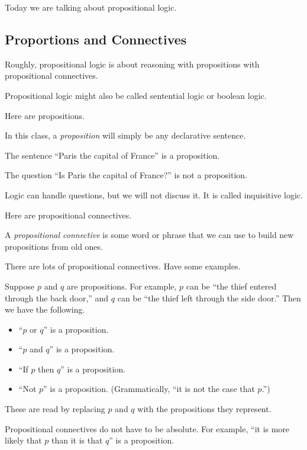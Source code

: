 

Today we are talking about propositional logic.

\subsection{Proportions and Connectives}
Roughly, propositional logic is about reasoning with propositions with propositional connectives.
\begin{remark}
	Propositional logic might also be called sentential logic or boolean logic.
\end{remark}
Here are propositions.
\begin{definition}[Proposition]
	In this class, a \textit{proposition} will simply be any declarative sentence.
\end{definition}
\begin{example}
	The sentence ``Paris the capital of France'' is a proposition.
\end{example}
\begin{nex}
	The question ``Is Paris the capital of France?'' is not a proposition.
\end{nex}
\begin{remark}
	Logic can handle questions, but we will not discuss it. It is called inquisitive logic.
\end{remark}
Here are propositional connectives.
\begin{definition}[Connective]
	A \textit{propositional connective} is some word or phrase that we can use to build new propositions from old ones.
\end{definition}
There are lots of propositional connectives. Have some examples.
\begin{example}
	Suppose $p$ and $q$ are propositions. For example, $p$ can be ``the thief entered through the back door,'' and $q$ can be ``the thief left through the side door.'' Then we have the following.
	\begin{itemize}
		\item ``$p$ or $q$'' is a proposition.
		\item ``$p$ and $q$'' is a proposition.
		\item ``If $p$ then $q$'' is a proposition.
		\item ``Not $p$'' is a proposition. (Grammatically, ``it is not the case that $p$.'')
	\end{itemize}
	These are read by replacing $p$ and $q$ with the propositions they represent.
\end{example}
\begin{example}
	Propositional connectives do not have to be absolute. For example, ``it is more likely that $p$ than it is that $q$'' is a proposition.
\end{example}

